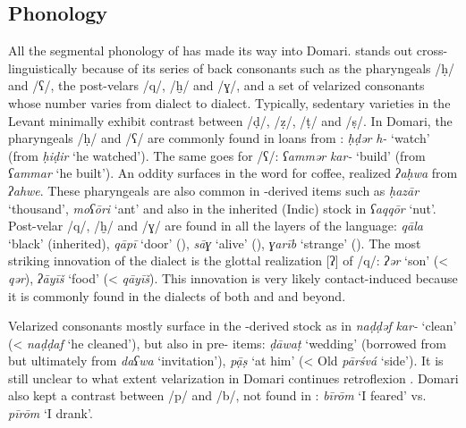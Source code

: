 \documentclass[output=paper]{langsci/langscibook}
\begin{document}
 
 \subsection{Phonology}


All the segmental phonology of  has made its way into Domari.  stands out cross-linguistically because of its series of back consonants such as the {pharyngeals} /ḥ/ and /ʕ/, the post-velars /q/, /ḫ/ and /ɣ/, and a set of velarized consonants whose number varies from dialect to dialect. Typically, sedentary varieties in the Levant minimally exhibit contrast between /ḍ/, /ẓ/, /ṭ/ and /ṣ/. In Domari, the {pharyngeals} /ḥ/ and /ʕ/ are commonly found in loans from : \textit{ḥḍər} \textit{h-} ‘watch’ (from   \textit{ḥiḍir} ‘he watched’). The same goes for /ʕ/: \textit{ʕammər} \textit{kar-} `build' (from  \textit{ʕammar} `he built'). An oddity surfaces in the word for coffee, realized \textit{ʔaḥwa} from  \textit{ʔahwe}. These {pharyngeals} are also common in -derived items such as \textit{ḥazār} ‘thousand’, \textit{moʕōri} ‘ant’ and also in the inherited (Indic) stock in \textit{ʕaqqōr} ‘nut’. Post-velar /q/, /ḫ/ and /ɣ/ are found in all the layers of the language: \textit{qāla} ‘black’ (inherited), \textit{qāpī} ‘door’ (), \textit{sāɣ} ‘alive’ (), \textit{ɣarīb} ‘strange’ (). The most striking innovation of the  dialect is the glottal realization [ʔ] of /q/: \textit{ʔər} ‘son’ (< \textit{qər}), \textit{ʔāyīš} ‘food’ (< \textit{qāyīš}). This innovation is very likely contact-induced because it is commonly found in the  dialects of both  and  and beyond. 

Velarized consonants mostly surface in the -derived stock as in \textit{naḍḍəf} \textit{kar-} ‘clean’ (<  \textit{naḍḍaf} ‘he cleaned’), but also in pre- items: \textit{ḍāwaṭ} ‘wedding’ (borrowed from  but ultimately from  \textit{daʕwa} ‘invitation’), \textit{pạ̄ṣ} ‘at him’ (< Old  \textit{pārśvá} ‘side’). It is still unclear to what extent velarization in Domari continues  retroflexion \citep[64]{Matras2012}. Domari also kept a contrast between /p/ and /b/, not found in : \textit{bīrōm} ‘I feared’ vs. \textit{pīrōm} ‘I drank’. 
\end{document}
